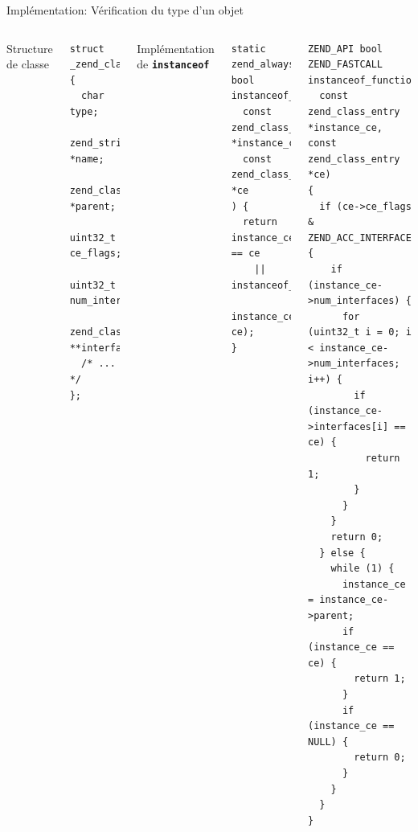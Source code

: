 \documentclass[10pt]{beamer}
\begin{document}
\begin{frame}[fragile]{Implémentation: Vérification du type d'un objet}
      \begin{columns}[T,onlytextwidth]
        Structure de classe
    \begin{verbatim}
struct _zend_class_entry {
  char type;
  zend_string *name;
  zend_class_entry *parent;
  uint32_t ce_flags;
  uint32_t num_interfaces;
  zend_class_entry **interfaces;
  /* ... */
};
    \end{verbatim}
    Implémentation de \texttt{\textbf{instanceof}}
    \begin{verbatim}
static zend_always_inline bool
instanceof_function(
  const zend_class_entry *instance_ce,
  const zend_class_entry *ce
) {
  return instance_ce == ce
    || instanceof_function_slow(
               instance_ce, ce);
}
    \end{verbatim}
    
    \begin{verbatim}
ZEND_API bool ZEND_FASTCALL instanceof_function_slow(
  const zend_class_entry *instance_ce, const zend_class_entry *ce)
{
  if (ce->ce_flags & ZEND_ACC_INTERFACE) {
    if (instance_ce->num_interfaces) {
      for (uint32_t i = 0; i < instance_ce->num_interfaces; i++) {
        if (instance_ce->interfaces[i] == ce) {
          return 1;
        }
      }
    }
    return 0;
  } else {
    while (1) {
      instance_ce = instance_ce->parent;
      if (instance_ce == ce) {
        return 1;
      }
      if (instance_ce == NULL) {
        return 0;
      }
    }
  }
}
    \end{verbatim}
      \end{columns}
\end{frame}
\end{document}
